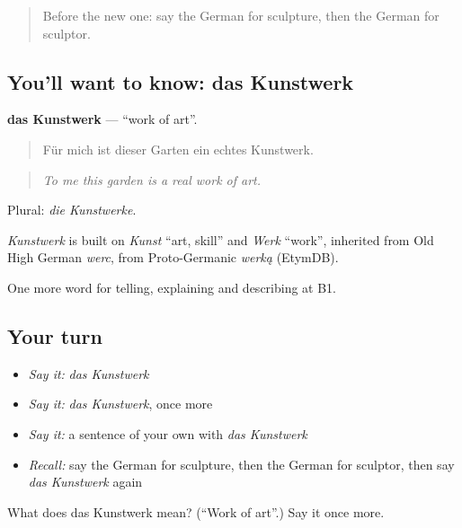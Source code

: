 \label{lesson:GE-C519-kunstwerk}



\begin{quote}
Before the new one: say the German for sculpture, then the German for sculptor.
\end{quote}

\subsection*{You'll want to know: das Kunstwerk}
\textbf{das Kunstwerk} — \textquotedblleft{}work of art\textquotedblright{}.

\begin{quote}
Für mich ist dieser Garten ein echtes Kunstwerk.
\end{quote}

\begin{quote}
\emph{To me this garden is a real work of art.}
\end{quote}

Plural: \emph{die Kunstwerke}.

\begin{cousinweb}
\emph{Kunstwerk} is built on \emph{Kunst} \textquotedblleft{}art, skill\textquotedblright{} and \emph{Werk} \textquotedblleft{}work\textquotedblright{}, inherited from Old High German \emph{werc}, from Proto-Germanic \emph{werką} (EtymDB).
\end{cousinweb}

\begin{grammarlens}[title={What you've built}]
One more word for telling, explaining and describing at B1.
\end{grammarlens}

\subsection*{Your turn}
\begin{itemize}
\raggedright
  \item \emph{Say it:} \emph{das Kunstwerk}
  \item \emph{Say it:} \emph{das Kunstwerk}, once more
  \item \emph{Say it:} a sentence of your own with \emph{das Kunstwerk}
  \item \emph{Recall:} say the German for sculpture, then the German for sculptor, then say \emph{das Kunstwerk} again
\end{itemize}

\begin{tcolorbox}[breakable,colback=teal!4,colframe=teal!35!black,title={Before you move on}]
What does das Kunstwerk mean? (\textquotedblleft{}Work of art\textquotedblright{}.) Say it once more.
\end{tcolorbox}

